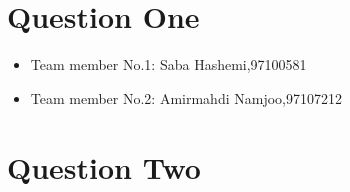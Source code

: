 \documentclass[12pt]{article}
\begin{document}
	
	
	\section{Question One}
	
	\begin{itemize}
		
		\item Team member No.1: Saba Hashemi,97100581
		\item Team member No.2: Amirmahdi Namjoo,97107212
	\end{itemize}
	
	
	\newpage
	
	\section{Question Two}
	
	
	
	\newpage
	
\end{document}
